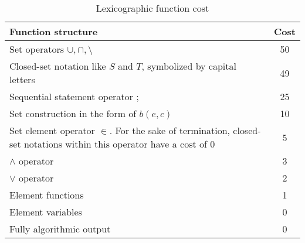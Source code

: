 \documentclass{article}
\begin{document}
\begin{table}
  \begin{center}
  \begin{tabular}{| p{10cm} | c |}
    \hline
    Function structure & Cost \\
    \hline
    Set operators $\cup, \cap, \setminus$ & 50\\
    Closed-set notation like $S$ and $T$, symbolized by capital letters & 49\\
    Sequential statement operator $;$ & 25\\
    Set construction in the form of $b(e, c)$ & 10\\
    Set element operator $\in$. For the sake of termination, closed-set notations within this operator have a cost of 0 &5\\
    $\land$ operator & 3 \\
    $\lor$ operator & 2\\
    Element functions & 1\\
    Element variables & 0\\
    Fully algorithmic output &0 \\
    \hline
  \end{tabular}
  \end{center}
  \caption{Lexicographic function cost}
  \label{tab:lpoTable}
\end{table}
\end{document}
